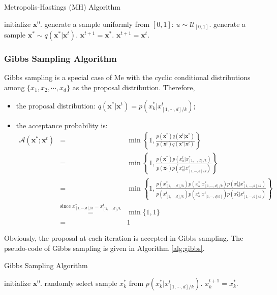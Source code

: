 \begin{algorithm}[h]
	\caption{Metropolis-Hastings (MH) Algorithm}
	\label{alg:MH}
\begin{algorithmic}[1]
\STATE initialize $\mathbf{x}^0$.
\STATE generate a sample uniformly from $[0,1]$: $u\sim \mathcal{U}_{[0,1]}$.
\STATE generate a sample $\mathbf{x}^*\sim q(\mathbf{x}^*|\mathbf{x}^t)$.
\STATE $\mathbf{x}^{t+1}=\mathbf{x}^*$.
\ELSE 
\STATE $\mathbf{x}^{t+1}=\mathbf{x}^t$.
\ENDIF
\ENDFOR
\end{algorithmic}
\end{algorithm}





\subsubsection{Gibbs Sampling Algorithm}
Gibbs sampling is a special case of Me with the cyclic conditional distributions among $\{x_1,x_2,\cdots,x_d\}$ as the proposal distribution. Therefore,  
\begin{itemize}
	\item the proposal distribution: $q(\mathbf{x}^*|\mathbf{x}^t)=p(x_k^*|x_{[1,\cdots,d]/k}^t)$;
	\item the acceptance probability is: 
		\begin{equation*}
			\begin{array}{rcl}
				\mathcal{A}(\mathbf{x}^*;\mathbf{x}^t) &=& \min\left\{1, \frac{p(\mathbf{x}^*)q(\mathbf{x}^t|\mathbf{x}^*)}{p(\mathbf{x}^t)q(\mathbf{x}^*|\mathbf{x}^t)}\right\} \\
																				  &=& \min\left\{1, \frac{p(\mathbf{x}^*)p(x_k^t|x_{[1,\cdots,d]/k}^*)}{p(\mathbf{x}^t)p(x_k^*|x_{[1,\cdots,d]/k}^t)}\right\} \\
																			   &=& \min\left\{1,\frac{p(x_{[1,\cdots,d]/k}^*)p(x_k^*|x^*_{[1,\cdots,d]/k})p(x_k^t|x_{[1,\cdots,d]/k}^*)}{p(x^t_{[1,\cdots,d]/k})p(x_k^t|x^t_{[1,\cdots,d/k]})p(x_k^*|x_{[1,\cdots,d]/k}^t)} \right \} \\
											  &\overset{\text{since }x_{[1,\cdots,d]/k}^*=x_{[1,\cdots,d]/k}^t}=& \min\{1,1\} \\
							   &=&1
        	\end{array}
	    \end{equation*}
\end{itemize}
Obviously,  the proposal at each iteration is accepted in Gibbs sampling. The pseudo-code of Gibbs sampling is given in Algorithm \ref{alg:gibbs}.    
\begin{algorithm}[h]
	\caption{Gibbs Sampling Algorithm}
	\label{alg:gibbs}
\begin{algorithmic}[1]
\STATE initialize $\mathbf{x}^0$.
\STATE randomly select   
\STATE sample $x^*_k$ from  $p(x_k^*|x_{[1,\cdots,d]/k}^t)$.
\STATE $x^{t+1}_k=x^*_k$.
\ENDFOR
\end{algorithmic}
\end{algorithm}

